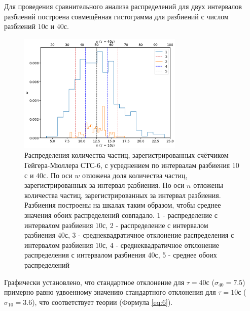 \documentclass[12pt]{article}
\begin{document}
Для проведения сравнительного анализа распределений для двух интервалов разбиений построена совмещённая гистограмма для разбиений с 
числом разбиений $10$с и $40$с.

\begin{figure}[H]
    \begin{center}
        \includegraphics[width=0.7\textwidth]{gr3}
    \end{center}
    \caption{Распределения количества частиц, зарегистрированных счётчиком Гейгера-Мюллера СТС-6, с усреднением по интервалам разбиения
        $10$с и $40$с. По оси $w$ отложена доля количества частиц, зарегистрированных за интервал разбиения. 
        По оси $n$ отложены количества частиц, зарегистрированных за интервал разбиения. Разбиения построены на шкалах таким образом, 
        чтобы среднее значения обоих распределений совпадало. 1 - распределение с интервалом разбиения $10$с, 
        2 - распределение с интервалом разбиения $40$с, 3 - среднеквадратичное отклонение распределения с интервалом разбиения $10$с, 
        4 - среднеквадратичное отклонение распределения с интервалом разбиения $40$с, 5 - среднее обоих распределений}
    \label{fig:3}
\end{figure}
Графически установлено, что стандартное отклонение для $\tau = 40$с ($\sigma_{40} = 7.5$) примерно равно удвоенному значению
стандартного отклонения для $\tau = 10$с ($\sigma_{10} = 3.6$), что соответствует теории (Формула \ref{eq:6}).
\end{document}
